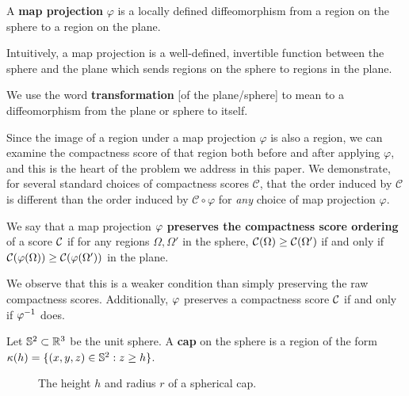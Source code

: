 \begin{definition}
  A \textbf{map projection} $\varphi$ is a locally defined 
  diffeomorphism from a region on the sphere to a region on the 
  plane. 
\end{definition}

Intuitively, a map projection is a well-defined, invertible function between the sphere and the plane which sends regions on the sphere to regions in the plane.

\begin{definition}
  We use the word \textbf{transformation} [of the plane/sphere] to mean
  to a diffeomorphism from the plane or sphere to itself.
\end{definition}

Since the image of a region under a map projection $\varphi$ is also
a region, we can examine the compactness score of that region both 
before and after applying $\varphi$, and this is the heart of the
problem we address in this paper.  We demonstrate, for several
standard choices of compactness scores $\mathcal{C}$, that the order
induced by $\mathcal{C}$ is different than the order induced by
$\mathcal{C}\circ\varphi$ for \textit{any} choice of map projection
$\varphi$.

\begin{definition}
  We say that a map projection $\varphi$ \textbf{preserves the  
  compactness score ordering} of a score $\mathcal{C}$ if for any regions 
  $\Omega,\Omega'$ in the sphere, $\mathcal{C}(\Omega)\ge \mathcal{C}(\Omega')$ 
  if and only if $\mathcal{C}(\varphi(\Omega)) \ge \mathcal{C}(\varphi(\Omega'))$ in the plane.
\end{definition}

  We observe that this is a weaker condition than simply preserving the raw compactness scores.  Additionally, $\varphi$ preserves a compactness score $\mathcal{C}$ 
  if and only if $\varphi^{-1}$ does.

\begin{definition}
  Let $\mathbb{S}^2\subset \mathbb{R}^3$ be the unit sphere. A 
  \textbf{cap} on the sphere is a region of the 
  form $\kappa(h) = \{(x,y,z)\in \mathbb{S}^2: z\ge h\}$.
\end{definition}

\begin{figure}[h]
  \centering
  
  \caption{ The height $h$ and radius $r$ of a spherical cap. }
  \label{fig:caphr}
\end{figure}





